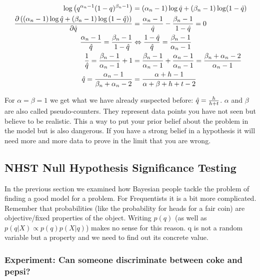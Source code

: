 \begin{align*}
\log{\left(q^{\alpha_n-1}(1-q)^{\beta_n-1}\right)} &= (\alpha_n-1)\log \est{q} + (\beta_n-1)\log (1-\est{q}) \\
\frac{\partial \left(\left(\alpha_n-1\right)\log \est{q} + \left(\beta_n-1\right)\log \left(1-\est{q}\right)\right)}{\partial \est{q}} &= \frac{\alpha_n-1}{\est{q}} - \frac{\beta_n-1}{1-\est{q}} = 0 \\
\frac{\alpha_n-1}{\est{q}} = \frac{\beta_n-1}{1-\est{q}} &\Leftrightarrow \frac{1-\est{q}}{\est{q}} = \frac{\beta_n-1}{\alpha_n-1} \\
\frac{1}{\est{q}} = \frac{\beta_n-1}{\alpha_n-1}+1 &= \frac{\beta_n-1}{\alpha_n-1} + \frac{\alpha_n-1}{\alpha_n-1} = \frac{\beta_n+\alpha_n-2}{\alpha_n-1} \\
\est{q} = \frac{\alpha_n-1}{\beta_n+\alpha_n-2} &= \frac{\alpha+h-1}{\alpha+\beta+h+t-2}
\end{align*}


For $\alpha = \beta =1$ we get what we have already suspected before: $\est{q}=\frac{h}{h+t}$. $\alpha$ and $\beta$ are also called pseudo-counters. They represent data points you have not seen but believe to be realistic. This a way to put your prior belief about the problem in the model but is also dangerous. If you have a strong belief in a hypothesis it will need more and more data to prove in the limit that you are wrong.

\subsection[Null Hypothesis Significance Testing (NHST)]{NHST Null Hypothesis Significance Testing}
In the previous section we examined how Bayesian people tackle the problem of finding a good model for a problem. For Frequentists it is a bit more complicated. Remember that probabilities (like the probability for heads for a fair coin) are objective/fixed properties of the object. Writing $p(q)$ (as well as $p(q|X) \propto p(q)p(X|q)$) makes no sense for this reason. q is not a random variable but a property and we need to find out its concrete value.

\subsubsection*{Experiment: Can someone discriminate between coke and pepsi?}

